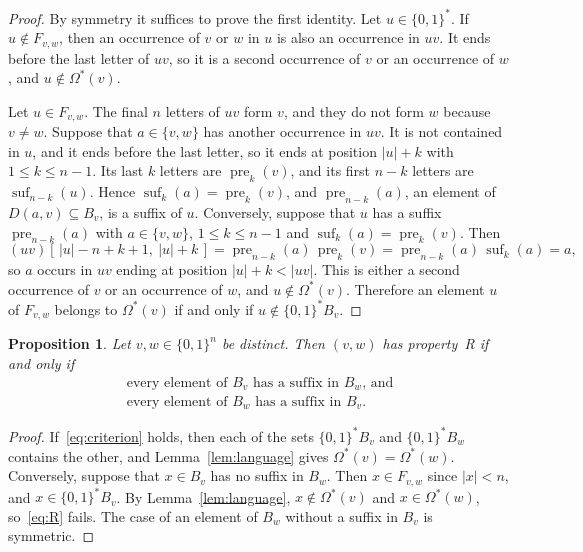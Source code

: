 \documentclass[11pt]{amsart}
\newtheorem{proposition}[theorem]{Proposition}
\theoremstyle{remark}
\numberwithin{equation}{section}
\newcommand{\pre}{\operatorname{pre}}
\newcommand{\suf}{\operatorname{suf}}
\newcommand{\Os}{\Omega^{*}}
\newcommand{\bits}{\{0,1\}}
\begin{document}
\begin{proof}
By symmetry it suffices to prove the first identity. Let $u\in\bits^*$. If $u\notin F_{v,w}$, then an occurrence of $v$ or $w$ in $u$ is also an occurrence in $uv$. It ends before the last letter of $uv$, so it is a second occurrence of $v$ or an occurrence of $w$, and $u\notin\Os(v)$.

Let $u\in F_{v,w}$. The final $n$ letters of $uv$ form $v$, and they do not form $w$ because $v\ne w$. Suppose that $a\in\{v,w\}$ has another occurrence in $uv$. It is not contained in $u$, and it ends before the last letter, so it ends at position $|u|+k$ with $1\le k\le n-1$. Its last $k$ letters are $\pre_k(v)$, and its first $n-k$ letters are $\suf_{n-k}(u)$. Hence $\suf_k(a)=\pre_k(v)$, and $\pre_{n-k}(a)$, an element of $D(a,v)\subseteq B_v$, is a suffix of $u$. Conversely, suppose that $u$ has a suffix $\pre_{n-k}(a)$ with $a\in\{v,w\}$, $1\le k\le n-1$ and $\suf_k(a)=\pre_k(v)$. Then
\[
  (uv)[\,|u|-n+k+1,\ |u|+k\,]=\pre_{n-k}(a)\,\pre_k(v)=\pre_{n-k}(a)\,\suf_k(a)=a,
\]
so $a$ occurs in $uv$ ending at position $|u|+k<|uv|$. This is either a second occurrence of $v$ or an occurrence of $w$, and $u\notin\Os(v)$. Therefore an element $u$ of $F_{v,w}$ belongs to $\Os(v)$ if and only if $u\notin\bits^*B_v$.
\end{proof}

\begin{proposition}\label{prop:criterion}
Let $v,w\in\bits^n$ be distinct. Then $(v,w)$ has property~R if and only if
\begin{equation}\label{eq:criterion}
  \begin{gathered}
  \text{every element of $B_v$ has a suffix in $B_w$, and}\\
  \text{every element of $B_w$ has a suffix in $B_v$.}
  \end{gathered}
\end{equation}
\end{proposition}

\begin{proof}
If~\eqref{eq:criterion} holds, then each of the sets $\bits^*B_v$ and $\bits^*B_w$ contains the other, and Lemma~\ref{lem:language} gives $\Os(v)=\Os(w)$. Conversely, suppose that $x\in B_v$ has no suffix in $B_w$. Then $x\in F_{v,w}$ since $|x|<n$, and $x\in\bits^*B_v$. By Lemma~\ref{lem:language}, $x\notin\Os(v)$ and $x\in\Os(w)$, so~\eqref{eq:R} fails. The case of an element of $B_w$ without a suffix in $B_v$ is symmetric.
\end{proof}
\end{document}
